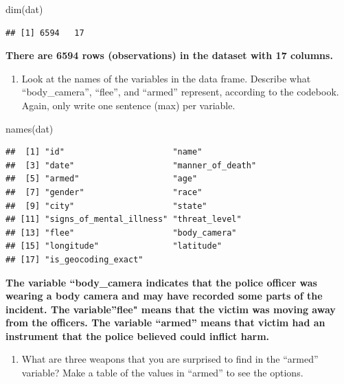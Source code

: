 \documentclass[
]{article}
\newenvironment{Shaded}{\begin{snugshade}}{\end{snugshade}}
\newcommand{\FunctionTok}[1]{\textcolor[rgb]{0.00,0.00,0.00}{#1}}
\newcommand{\NormalTok}[1]{#1}
\providecommand{\tightlist}{%
  \setlength{\itemsep}{0pt}\setlength{\parskip}{0pt}}
\begin{document}
\begin{Shaded}
\begin{Highlighting}[]
\FunctionTok{dim}\NormalTok{(dat)}
\end{Highlighting}
\end{Shaded}

\begin{verbatim}
## [1] 6594   17
\end{verbatim}

\textbf{There are 6594 rows (observations) in the dataset with 17
columns. }

\begin{enumerate}
\def\labelenumi{\alph{enumi}.}
\setcounter{enumi}{2}
\tightlist
\item
  Look at the names of the variables in the data frame. Describe what
  ``body\_camera'', ``flee'', and ``armed'' represent, according to the
  codebook. Again, only write one sentence (max) per variable.
\end{enumerate}

\begin{Shaded}
\begin{Highlighting}[]
\FunctionTok{names}\NormalTok{(dat)}
\end{Highlighting}
\end{Shaded}

\begin{verbatim}
##  [1] "id"                      "name"                   
##  [3] "date"                    "manner_of_death"        
##  [5] "armed"                   "age"                    
##  [7] "gender"                  "race"                   
##  [9] "city"                    "state"                  
## [11] "signs_of_mental_illness" "threat_level"           
## [13] "flee"                    "body_camera"            
## [15] "longitude"               "latitude"               
## [17] "is_geocoding_exact"
\end{verbatim}

\textbf{The variable ``body\_camera indicates that the police officer
was wearing a body camera and may have recorded some parts of the
incident. The variable''flee" means that the victim was moving away from
the officers. The variable ``armed'' means that victim had an instrument
that the police believed could inflict harm. }

\begin{enumerate}
\def\labelenumi{\alph{enumi}.}
\setcounter{enumi}{3}
\tightlist
\item
  What are three weapons that you are surprised to find in the ``armed''
  variable? Make a table of the values in ``armed'' to see the options.
\end{enumerate}
\end{document}
